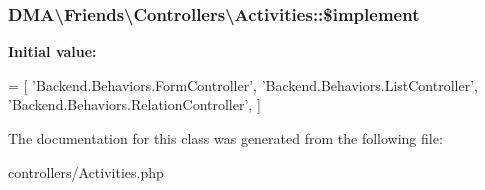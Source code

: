 \subsubsection[{\$implement}]{\setlength{\rightskip}{0pt plus 5cm}D\+M\+A\textbackslash{}\+Friends\textbackslash{}\+Controllers\textbackslash{}\+Activities\+::\$implement}\label{classDMA_1_1Friends_1_1Controllers_1_1Activities_aff57941f0ab53e417ce578994badc87f}
{\bfseries Initial value\+:}
\begin{DoxyCode}
= [
        \textcolor{stringliteral}{'Backend.Behaviors.FormController'},
        \textcolor{stringliteral}{'Backend.Behaviors.ListController'},
        \textcolor{stringliteral}{'Backend.Behaviors.RelationController'},
    ]
\end{DoxyCode}


The documentation for this class was generated from the following file\+:\begin{DoxyCompactItemize}
\item 
controllers/Activities.\+php\end{DoxyCompactItemize}
